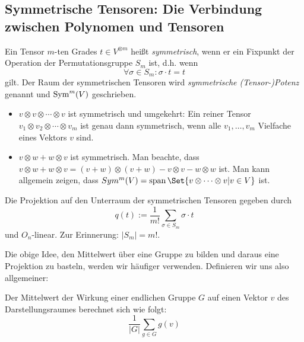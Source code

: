 \subsection{Symmetrische Tensoren: Die Verbindung zwischen Polynomen und Tensoren}

\begin{definition}\label{symmetrische_tensoren:def}
Ein Tensor $m$-ten Grades $t\in V^{\otimes m}$ heißt \emph{symmetrisch}, wenn er ein Fixpunkt der Operation der Permutationsgruppe $S_m$ ist, d.h. wenn
\[\forall \sigma\in S_m: \sigma\cdot t = t\]
gilt. Der Raum der symmetrischen Tensoren wird \emph{symmetrische (Tensor-)Potenz} genannt und $\operatorname{Sym}^m(V)$ geschrieben.
\end{definition}

\begin{example}
\begin{itemize}
\item $v\otimes v\otimes \cdots\otimes v$ ist symmetrisch und umgekehrt: Ein reiner Tensor $v_1\otimes v_2\otimes\cdots\otimes v_m$ ist genau dann symmetrisch, wenn alle $v_1,\ldots, v_m$ Vielfache eines Vektors $v$ sind.
\item $v\otimes w + w\otimes v$ ist symmetrisch. Man beachte, dass $v\otimes w + w\otimes v = (v+w)\otimes(v+w) - v\otimes v - w\otimes w$ ist. Man kann allgemein zeigen, dass $Sym^m(V) = \operatorname{span}\Set{v\otimes\cdots\otimes v | v\in V}$ ist.
\end{itemize}
\end{example}

\begin{lemma}[Mittelwerttrick]\label{symmetrische_tensoren:projektion}
Die Projektion auf den Unterraum der symmetrischen Tensoren gegeben durch
\[q(t) := \frac{1}{m!} \sum_{\sigma\in S_m} \sigma\cdot t\]
und $O_n$-linear. Zur Erinnerung: $|S_m| = m!$.
\end{lemma}

Die obige Idee, den Mittelwert über eine Gruppe zu bilden und daraus eine Projektion zu basteln, werden wir häufiger verwenden. Definieren wir uns also allgemeiner:
\begin{definition}
	Der Mittelwert der Wirkung einer endlichen Gruppe $G$ auf einen Vektor $v$ des Darstellungsraumes berechnet sich wie folgt:
	\[
		\frac{1}{|G|} \sum_{g\in G} g(v)
	\]
\end{definition}

